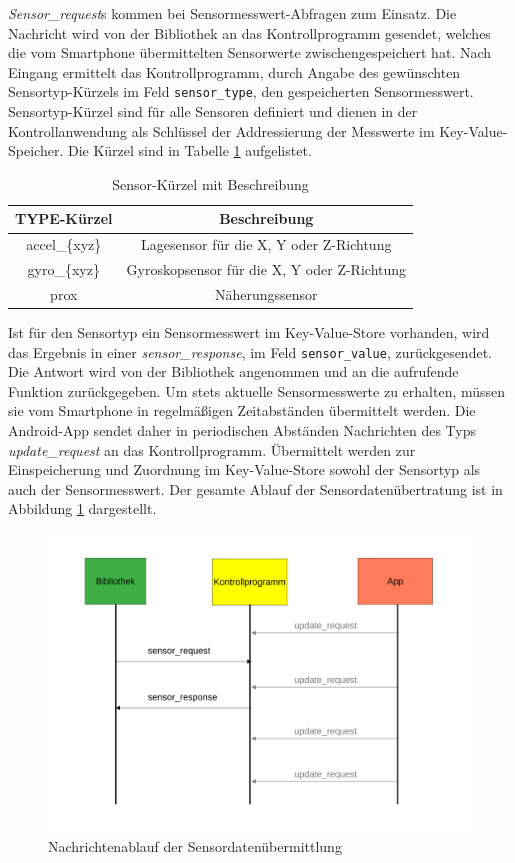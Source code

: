 \documentclass[11pt,a4paper]{report}
\begin{document}
\textit{Sensor\_request}s kommen bei Sensormesswert-Abfragen zum Einsatz.
Die Nachricht wird von der Bibliothek an das Kontrollprogramm gesendet, welches die vom Smartphone übermittelten Sensorwerte zwischengespeichert hat.
Nach Eingang ermittelt das Kontrollprogramm, durch Angabe des gewünschten Sensortyp-Kürzels im Feld \texttt{sensor\_type}, den gespeicherten Sensormesswert.
Sensortyp-Kürzel sind für alle Sensoren definiert und dienen in der Kontrollanwendung als Schlüssel der Addressierung der Messwerte im Key-Value-Speicher.
Die Kürzel sind in Tabelle \ref{tab:sensor_types} aufgelistet. 
\begin{table}[htbp]
  \centering
  \begin{tabular}{|c|c|}
      \hline
      \textbf{TYPE-Kürzel} & \textbf{Beschreibung} \\
      \hline
      accel\_\{xyz\} & Lagesensor für die X, Y oder Z-Richtung \\
      \hline
       gyro\_\{xyz\} & Gyroskopsensor für die X, Y oder Z-Richtung \\
      \hline
      prox & Näherungssensor \\
      \hline
  \end{tabular}
  \caption{Sensor-Kürzel mit Beschreibung}
  \label{tab:sensor_types}
\end{table}
Ist für den Sensortyp ein Sensormesswert im Key-Value-Store vorhanden, wird das Ergebnis in einer \textit{sensor\_response}, im Feld \texttt{sensor\_value}, zurückgesendet.
Die Antwort wird von der Bibliothek angenommen und an die aufrufende Funktion zurückgegeben.
Um stets aktuelle Sensormesswerte zu erhalten, müssen sie vom Smartphone in regelmäßigen Zeitabständen übermittelt werden.
Die Android-App sendet daher in periodischen Abständen Nachrichten des Typs \textit{update\_request} an das Kontrollprogramm.
Übermittelt werden zur Einspeicherung und Zuordnung im Key-Value-Store sowohl der Sensortyp als auch der Sensormesswert.
Der gesamte Ablauf der Sensordatenübertratung ist in Abbildung \ref{fig:message_flow_requests} dargestellt.
\begin{figure}[htbp]
\centering
\includegraphics[width=.8\textwidth]{images/message_flow_sensor.pdf}
\caption{Nachrichtenablauf der Sensordatenübermittlung}
\label{fig:message_flow_requests}
\end{figure}
\end{document}
